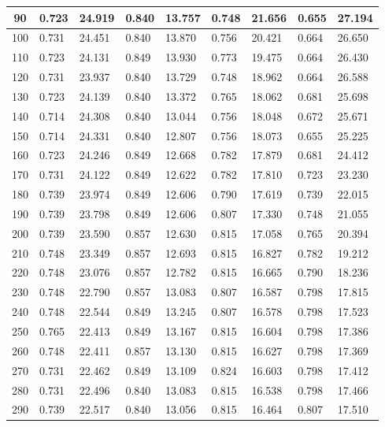 \begin{longtable}{|c|l|l|l|l|l|l|l|l|}
        90 & 0.723 & 24.919 & 0.840 & 13.757 & 0.748 & 21.656 & 0.655 & 27.194 \\ \hline
        100 & 0.731 & 24.451 & 0.840 & 13.870 & 0.756 & 20.421 & 0.664 & 26.650 \\ \hline
        110 & 0.723 & 24.131 & 0.849 & 13.930 & 0.773 & 19.475 & 0.664 & 26.430 \\ \hline
        120 & 0.731 & 23.937 & 0.840 & 13.729 & 0.748 & 18.962 & 0.664 & 26.588 \\ \hline
        130 & 0.723 & 24.139 & 0.840 & 13.372 & 0.765 & 18.062 & 0.681 & 25.698 \\ \hline
        140 & 0.714 & 24.308 & 0.840 & 13.044 & 0.756 & 18.048 & 0.672 & 25.671 \\ \hline
        150 & 0.714 & 24.331 & 0.840 & 12.807 & 0.756 & 18.073 & 0.655 & 25.225 \\ \hline
        160 & 0.723 & 24.246 & 0.849 & 12.668 & 0.782 & 17.879 & 0.681 & 24.412 \\ \hline
        170 & 0.731 & 24.122 & 0.849 & 12.622 & 0.782 & 17.810 & 0.723 & 23.230 \\ \hline
        180 & 0.739 & 23.974 & 0.849 & 12.606 & 0.790 & 17.619 & 0.739 & 22.015 \\ \hline
        190 & 0.739 & 23.798 & 0.849 & 12.606 & 0.807 & 17.330 & 0.748 & 21.055 \\ \hline
        200 & 0.739 & 23.590 & 0.857 & 12.630 & 0.815 & 17.058 & 0.765 & 20.394 \\ \hline
        210 & 0.748 & 23.349 & 0.857 & 12.693 & 0.815 & 16.827 & 0.782 & 19.212 \\ \hline
        220 & 0.748 & 23.076 & 0.857 & 12.782 & 0.815 & 16.665 & 0.790 & 18.236 \\ \hline
        230 & 0.748 & 22.790 & 0.857 & 13.083 & 0.807 & 16.587 & 0.798 & 17.815 \\ \hline
        240 & 0.748 & 22.544 & 0.849 & 13.245 & 0.807 & 16.578 & 0.798 & 17.523 \\ \hline
        250 & 0.765 & 22.413 & 0.849 & 13.167 & 0.815 & 16.604 & 0.798 & 17.386 \\ \hline
        260 & 0.748 & 22.411 & 0.857 & 13.130 & 0.815 & 16.627 & 0.798 & 17.369 \\ \hline
        270 & 0.731 & 22.462 & 0.849 & 13.109 & 0.824 & 16.603 & 0.798 & 17.412 \\ \hline
        280 & 0.731 & 22.496 & 0.840 & 13.083 & 0.815 & 16.538 & 0.798 & 17.466 \\ \hline
        290 & 0.739 & 22.517 & 0.840 & 13.056 & 0.815 & 16.464 & 0.807 & 17.510 \\ \hline

\end{longtable}
